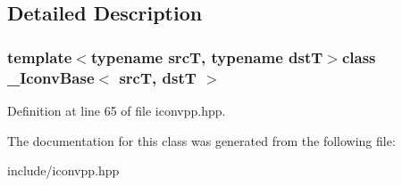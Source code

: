 \subsection{Detailed Description}
\subsubsection*{template$<$typename src\-T, typename dst\-T$>$class \-\_\-\-Iconv\-Base$<$ src\-T, dst\-T $>$}



Definition at line 65 of file iconvpp.\-hpp.



The documentation for this class was generated from the following file\-:\begin{DoxyCompactItemize}
\item 
include/iconvpp.\-hpp\end{DoxyCompactItemize}
